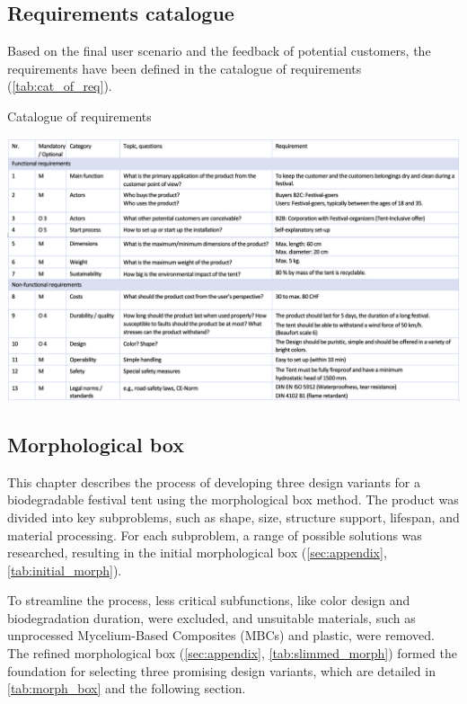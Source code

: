 \documentclass{article}
\begin{document}
\subsection{Requirements catalogue}
Based on the final user scenario and the feedback of potential customers, the
requirements have been defined in the catalogue of requirements (\autoref{tab:cat_of_req}).

\begin{table}[ht!]
    \centering
    \caption{Catalogue of requirements}
    \includegraphics[width=\textwidth]{media/req_cat_high_res.png}
    \label{tab:cat_of_req}
\end{table}

\subsection{Morphological box}
This chapter describes the process of developing three design variants for a
biodegradable festival tent using the morphological box method. The product was divided
into key subproblems, such as shape, size, structure support, lifespan, and material
processing. For each subproblem, a range of possible solutions was researched,
resulting in the initial morphological box (\autoref{sec:appendix}, \autoref{tab:initial_morph}).

To streamline the process, less critical subfunctions, like color design and
biodegradation duration, were excluded, and unsuitable materials, such as unprocessed
Mycelium-Based Composites (MBCs) and plastic, were removed. The refined
morphological box (\autoref{sec:appendix}, \autoref{tab:slimmed_morph}) formed the foundation
for selecting three promising design variants, which are detailed in \autoref{tab:morph_box}
and the following section. 
\end{document}
